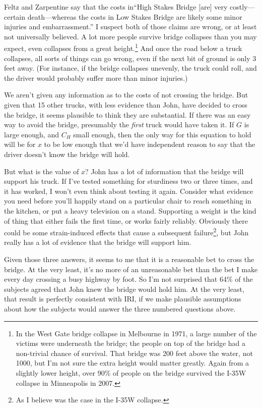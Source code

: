 \documentclass[11pt,oneside]{book}
\begin{document}
Feltz and Zarpentine say that the costs in``High Stakes Bridge [are] very costly---certain death---whereas the costs in Low Stakes Bridge are likely some minor injuries and embarrassment.'' \cite[??]{FeltzZarpentine2010} I suspect both of those claims are wrong, or at least not universally believed. A lot more people survive bridge collapses than you may expect, even collapses from a great height.\footnote{In the West Gate bridge collapse in Melbourne in 1971, a large number of the victims were underneath the bridge; the people on top of the bridge had a non-trivial chance of survival. That bridge was 200 feet above the water, not 1000, but I'm not sure the extra height would matter greatly. Again from a slightly lower height, over 90\% of people on the bridge survived the I-35W collapse in Minneapolis in 2007.} And once the road below a truck collapses, all sorts of things can go wrong, even if the next bit of ground is only 3 feet away. (For instance, if the bridge collapses unevenly, the truck could roll, and the driver would probably suffer more than minor injuries.)

We aren't given any information as to the costs of not crossing the bridge. But given that 15 other trucks, with less evidence than John, have decided to cross the bridge, it seems plausible to think they are substantial. If there was an easy way to avoid the bridge, presumably the \textit{first} truck would have taken it. If $G$ is large enough, and $C_H$ small enough, then the only way for this equation to hold will be for $x$ to be low enough that we'd have independent reason to say that the driver doesn't know the bridge will hold.

But what is the value of $x$? John has a lot of information that the bridge will support his truck. If I've tested something for sturdiness two or three times, and it has worked, I won't even think about testing it again. Consider what evidence you need before you'll happily stand on a particular chair to reach something in the kitchen, or put a heavy television on a stand. Supporting a weight is the kind of thing that either fails the first time, or works fairly reliably. Obviously there could be some strain-induced effects that cause a subsequent failure\footnote{As I believe was the case in the I-35W collapse.}, but John really has a lot of evidence that the bridge will support him.

Given those three answers, it seems to me that it is a reasonable bet to cross the bridge. At the very least, it's no more of an unreasonable bet than the bet I make every day crossing a busy highway by foot. So I'm not surprised that 64\% of the subjects agreed that John knew the bridge would hold him. At the very least, that result is perfectly consistent with IRI, if we make plausible assumptions about how the subjects would answer the three numbered questions above.
\end{document}
